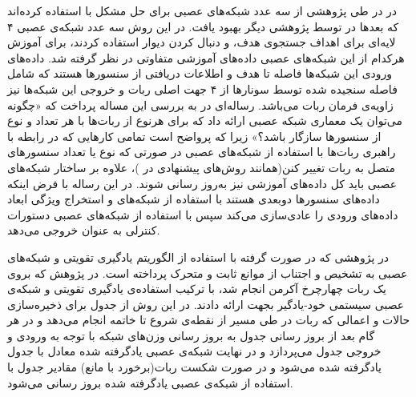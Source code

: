 در  در طی پژوهشی از سه عدد شبکه‌های عصبی برای حل مشکل  با استفاده کرده‌اند که بعدها در  توسط پژوهشی دیگر بهبود یافت. در این روش سه عدد شبکه‌ی عصبی ۴ لایه‌ای برای اهداف جستجوی هدف،  و دنبال کردن دیوار استفاده کردند، برای آموزش هرکدام از این شبکه‌های عصبی داده‌های آموزشی متفاوتی در نظر گرفته شد. داده‌های ورودی این شبکه‌ها فاصله تا هدف و اطلاعات دریافتی از سنسورها هستند که شامل فاصله سنجیده شده توسط سونارها از ۴ جهت اصلی ربات و خروجی این شبکه‌ها نیز زاویه‌ی فرمان ربات می‌باشد.
رساله‌ای در  به بررسی این مساله پرداخت که «چگونه می‌توان یک معماری شبکه عصبی ارائه داد که برای هرنوع از ربات‌ها با هر تعداد و نوع از سنسورها سازگار باشد؟» زیرا که پرواضح است تمامی کارهایی که در رابطه با راهبری ربات‌ها با استفاده از شبکه‌های عصبی در صورتی که نوع یا تعداد سنسورهای متصل به ربات تغییر کنن(همانند روش‌های پیشنهادی در )، علاوه بر ساختار شبکه‌های عصبی باید کل داده‌های آموزشی نیز به‌روز رسانی شوند. در این رساله با فرض اینکه داده‌های سنسورها دوبعدی هستند با استفاده از شبکه‌های  و استخراج ویژگی  ابعاد داده‌های ورودی را عادی‌سازی می‌کند سپس با استفاده از شبکه‌های عصبی دستورات کنترلی به عنوان خروجی می‌دهد.

در پژوهشی که در  صورت گرفته با استفاده از الگوریتم یادگیری تقویتی  و شبکه‌های عصبی به تشخیص و اجتناب از موانع ثابت و متحرک پرداخته است. در پژوهش که بروی یک ربات چهارچرخ آکرمن انجام شد، با ترکیب استفاده‌ی یادگیری تقویتی و شبکه‌ی عصبی سیستمی خود-یادگیر بجهت  ارائه دادند. در این روش از جدول  برای ذخیره‌سازی حالات و اعمالی که ربات در طی مسیر از نقطه‌ی شروع تا خاتمه انجام می‌دهد و در هر گام بعد از بروز رسانی جدول  به بروز رسانی وزن‌های شبکه با توجه به ورودی و خروجی جدول  می‌پردازد و در نهایت شبکه‌ی عصبی یادگرفته شده معادل با جدول یادگرفته شده  می‌شود و در صورت شکست ربات(برخورد با مانع) مقادیر جدول  با استفاده از شبکه‌ی عصبی یادگرفته شده بروز رسانی می‌شود.